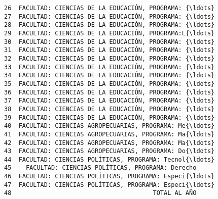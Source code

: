\documentclass[11pt]{article}
\begin{document}
\begin{Verbatim}[commandchars=\\\{\}]
26  FACULTAD: CIENCIAS DE LA EDUCACIÓN, PROGRAMA: {\ldots}                                   
27  FACULTAD: CIENCIAS DE LA EDUCACIÓN, PROGRAMA: {\ldots}                                   
28  FACULTAD: CIENCIAS DE LA EDUCACIÓN, PROGRAMA: {\ldots}                                   
29  FACULTAD: CIENCIAS DE LA EDUCACIÓN, PROGRAMA:L{\ldots}                                   
30  FACULTAD: CIENCIAS DE LA EDUCACIÓN, PROGRAMA: {\ldots}                                   
31  FACULTAD: CIENCIAS DE LA EDUCACIÓN, PROGRAMA: {\ldots}                                   
32  FACULTAD: CIENCIAS DE LA EDUCACIÓN, PROGRAMA: {\ldots}                                   
33  FACULTAD: CIENCIAS DE LA EDUCACIÓN, PROGRAMA: {\ldots}                                   
34  FACULTAD: CIENCIAS DE LA EDUCACIÓN, PROGRAMA: {\ldots}                                   
35  FACULTAD: CIENCIAS DE LA EDUCACIÓN, PROGRAMA: {\ldots}                                   
36  FACULTAD: CIENCIAS DE LA EDUCACIÓN, PROGRAMA: {\ldots}                                   
37  FACULTAD: CIENCIAS DE LA EDUCACIÓN, PROGRAMA: {\ldots}                                   
38  FACULTAD: CIENCIAS DE LA EDUCACIÓN, PROGRAMA: {\ldots}                                   
39  FACULTAD: CIENCIAS DE LA EDUCACIÓN, PROGRAMA: {\ldots}                                   
40  FACULTAD: CIENCIAS AGROPECUARIAS, PROGRAMA: Me{\ldots}                                   
41  FACULTAD: CIENCIAS AGROPECUARIAS, PROGRAMA: Ma{\ldots}                                   
42  FACULTAD: CIENCIAS AGROPECUARIAS, PROGRAMA: Ma{\ldots}                                   
43  FACULTAD: CIENCIAS AGROPECUARIAS, PROGRAMA: Do{\ldots}                                   
44  FACULTAD: CIENCIAS POLÍTICAS, PROGRAMA: Tecnol{\ldots}                                   
45    FACULTAD: CIENCIAS POLÍTICAS, PROGRAMA: Derecho                                   
46  FACULTAD: CIENCIAS POLÍTICAS, PROGRAMA: Especi{\ldots}                                   
47  FACULTAD: CIENCIAS POLÍTICAS, PROGRAMA: Especi{\ldots}                                   
48                                       TOTAL AL AÑO                                   


\end{Verbatim}
\end{document}
